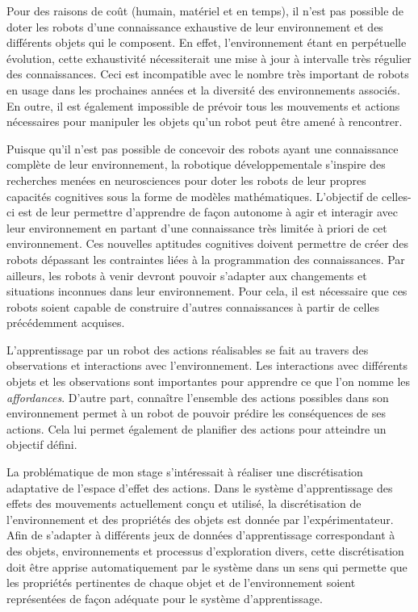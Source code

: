 \documentclass{llncs}
\begin{document}
Pour des raisons de coût (humain, matériel et en temps), il n'est pas possible de doter les robots d'une connaissance exhaustive de leur environnement et des différents objets qui le composent.
En effet, l'environnement étant en perpétuelle évolution, cette exhaustivité nécessiterait une mise à jour à intervalle très régulier des connaissances.
Ceci est incompatible avec le nombre très important de robots en usage dans les prochaines années et la diversité des environnements associés.
En outre, il est également impossible de prévoir tous les mouvements et actions nécessaires pour manipuler les objets qu'un robot peut être amené à rencontrer.

Puisque qu'il n'est pas possible de concevoir des robots ayant une connaissance complète de leur environnement, la robotique développementale s'inspire des recherches menées en neurosciences pour doter les robots de leur propres capacités cognitives sous la forme de modèles mathématiques.
L'objectif de celles-ci est de leur permettre d'apprendre de façon autonome à agir et interagir avec leur environnement en partant d'une connaissance très limitée à priori de cet environnement.
Ces nouvelles aptitudes cognitives doivent permettre de créer des robots dépassant les contraintes liées à la programmation des connaissances.
Par ailleurs, les robots à venir devront pouvoir s'adapter aux changements et situations inconnues dans leur environnement.
Pour cela, il est nécessaire que ces robots soient capable de construire d'autres connaissances à partir de celles précédemment acquises.

L'apprentissage par un robot des actions réalisables se fait au travers des observations et interactions avec l'environnement.
Les interactions avec différents objets et les observations sont importantes pour apprendre ce que l'on nomme les \textit{affordances}.
D'autre part, connaître l'ensemble des actions possibles dans son environnement permet à un robot de pouvoir prédire les conséquences de ses actions.
Cela lui permet également de planifier des actions pour atteindre un objectif défini.

La problématique de mon stage s'intéressait à réaliser une discrétisation adaptative de l'espace d'effet des actions.
Dans le système d'apprentissage des effets des mouvements actuellement conçu et utilisé, la discrétisation de l'environnement et des propriétés des objets est donnée par l'expérimentateur.
Afin de s'adapter à différents jeux de données d'apprentissage correspondant à des objets, environnements et processus d'exploration divers, cette discrétisation doit être apprise automatiquement par le système dans un sens qui permette que les propriétés pertinentes de chaque objet et de l'environnement soient représentées de façon adéquate pour le système d'apprentissage.
\end{document}
